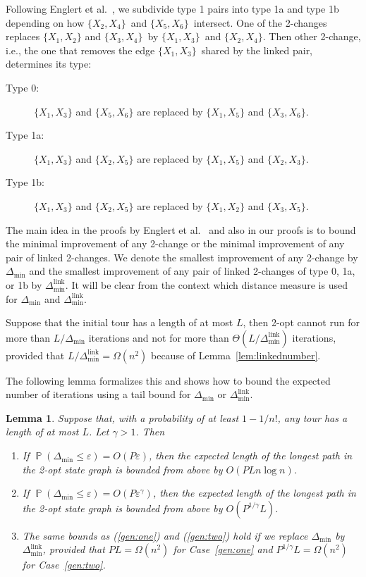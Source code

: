 \documentclass[11pt,DIV=12,a4paper]{scrartcl}
\newtheorem{lemma}[claim]{Lemma}
\newcommand{\edge}[2]{\ensuremath{\{X_{#1}, X_{#2}\}}}
\newcommand{\eps}{\varepsilon}
\newcommand{\dmin}{\Delta_{\min}}
\newcommand{\dminl}{\Delta_{\min}^{\operatorname{link}}}
\DeclareMathOperator{\probab}{\mathbb{P}}
\begin{document}
Following Englert et al.~\cite[Figure 8]{EnglertEA:2Opt:2014}, we subdivide type 1 pairs into type 1a and type 1b depending on
how \edge 24\ and \edge 56\ intersect. One of the 2-changes replaces \edge 12 and \edge 34\ by \edge 13\ and \edge 24.
Then other 2-change, i.e., the one that removes the edge \edge 13\ shared by the linked pair, determines its type:
\begin{description}
\item[Type 0:] $\edge 13$ and $\edge 56$ are replaced by $\edge 15$ and $\edge 36$.
\item[Type 1a:] $\edge 13$ and $\edge 25$ are replaced by $\edge 15$ and $\edge 23$.
\item[Type 1b:] $\edge 13$ and $\edge 25$ are replaced by $\edge 12$ and $\edge 35$.
\end{description}


The main idea in the proofs by Englert et al.~\cite{EnglertEA:2Opt:2014} and also in our proofs is
to bound the minimal improvement of any 2-change or
the minimal improvement of any pair of linked 2-changes. We denote the smallest improvement of any 2-change by $\dmin$
and the smallest improvement of any pair of linked 2-changes of type 0, 1a, or 1b by $\dminl$.
It will be clear from the context which distance measure is used
for $\dmin$ and $\dminl$.

Suppose that the initial tour has a length of at most $L$, then
2-opt cannot run for more than $L/\dmin$ iterations and
not for more than $\Theta(L/\dminl)$ iterations, provided that
$L/\dminl = \Omega(n^2)$ because of Lemma~\ref{lem:linkednumber}.

The following lemma formalizes this and shows how to bound the expected number of iterations using a tail bound for $\dmin$ or $\dminl$.

\begin{lemma}
\label{lem:generic}
Suppose that, with a probability of at least $1-1/n!$, any tour has a length of
at most $L$. Let $\gamma > 1$.
Then
\begin{enumerate}[label=(\arabic{*})]
\item If $\probab(\dmin \leq \eps) = O(P  \eps)$,
then the expected length of the longest path in the 2-opt state graph
is bounded from above by $O(PL n \log n)$. \label{gen:one}
\item If $\probab(\dmin \leq \eps) = O(P  \eps^\gamma)$,
then the expected length of the longest path in the 2-opt state graph
is bounded from above by $O(P^{1/\gamma}L)$. \label{gen:two}
\item The same bounds as (\ref{gen:one}) and (\ref{gen:two})
hold if we replace $\dmin$ by $\dminl$, provided that $PL = \Omega(n^2)$
for Case~\ref{gen:one} and $P^{1/\gamma}L = \Omega(n^2)$ for Case~\ref{gen:two}.
\label{gen:linked}
\end{enumerate}
\end{lemma}
\end{document}
